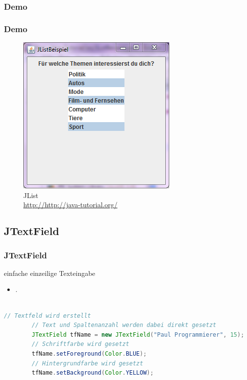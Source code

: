 \documentclass[xcolor=dvipsnames]{beamer}
\begin{document}
\subsubsection{Demo}
\begin{frame}
  \frametitle{Demo}
	\begin{figure}
		\includegraphics[scale=0.8]{images/jlist.PNG}
		\caption{JList \\ \tiny{\textcolor{gray}{\url{http://http://java-tutorial.org/}}}}
		\end{figure}
\end{frame}



\subsection{JTextField}
\begin{frame}  %
  \frametitle{JTextField
} %
  \begin{block}{einfache einzeilige Texteingabe}
	  \begin{itemize}
		\item .
	  \end{itemize}
  \end{block}

\begin{lstlisting}[language=java,basicstyle=\scriptsize\ttfamily]

// Textfeld wird erstellt
        // Text und Spaltenanzahl werden dabei direkt gesetzt
        JTextField tfName = new JTextField("Paul Programmierer", 15);
        // Schriftfarbe wird gesetzt
        tfName.setForeground(Color.BLUE);
        // Hintergrundfarbe wird gesetzt
        tfName.setBackground(Color.YELLOW);

\end{lstlisting}

\end{frame}
\end{document}
